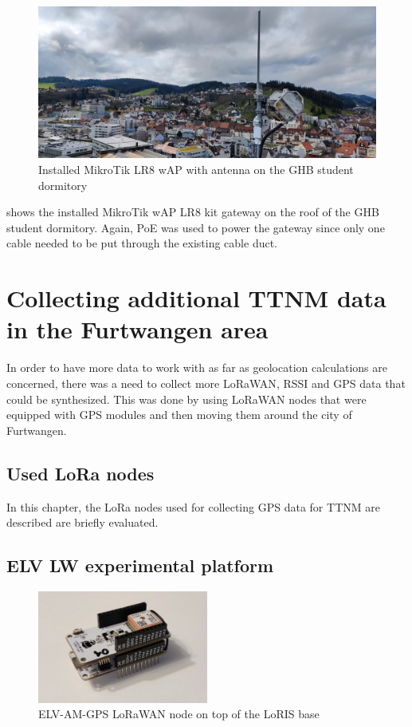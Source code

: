 \begin{figure}[h]
    \centering
    \includegraphics[width=1\textwidth]{pictures/hardware/gateway-deployment/lr8_ghb_installation.jpg}
    \caption{Installed MikroTik LR8 wAP with antenna on the GHB student dormitory\label{pic:mikrotik-gateway-ghb-installation}}
\end{figure}

 shows the installed MikroTik wAP LR8 kit gateway on the roof of the \ac{GHB} student dormitory.
Again, \ac{PoE} was used to power the gateway since only one cable needed to be put through the existing cable duct.

\section{Collecting additional \acf{TTNM} data in the Furtwangen area}

In order to have more data to work with as far as geolocation calculations are concerned, there was a need to collect more \ac{LoRaWAN}, \ac{RSSI} and \ac{GPS} data that could be synthesized.
This was done by using \ac{LoRaWAN} nodes that were equipped with \ac{GPS} modules and then moving them around the city of Furtwangen.

\subsection{Used \acs{LoRa} nodes}

In this chapter, the \ac{LoRa} nodes used for collecting \ac{GPS} data for \ac{TTNM} are described are briefly evaluated.

\subsection{ELV LW experimental platform}

\begin{figure}[h]
    \centering
    \includegraphics[width=0.5\textwidth]{pictures/hardware/gps-nodes/loris_bare.jpg}
    \caption{ELV-AM-GPS \ac{LoRaWAN} node on top of the LoRIS base\label{pic:loris-node-bare}}
\end{figure}

